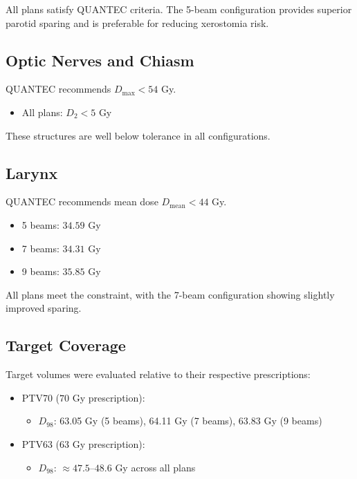 All plans satisfy QUANTEC criteria. The 5-beam configuration provides superior parotid sparing and is preferable for reducing xerostomia risk.

\subsection*{Optic Nerves and Chiasm}
QUANTEC recommends $D_{\max} < 54$ Gy.

\begin{itemize}
    \item All plans: $D_{2} < 5$ Gy
\end{itemize}

These structures are well below tolerance in all configurations.

\subsection*{Larynx}
QUANTEC recommends mean dose $D_{\text{mean}} < 44$ Gy.

\begin{itemize}
    \item 5 beams: $34.59$ Gy
    \item 7 beams: $34.31$ Gy
    \item 9 beams: $35.85$ Gy
\end{itemize}

All plans meet the constraint, with the 7-beam configuration showing slightly improved sparing.

\subsection*{Target Coverage}
Target volumes were evaluated relative to their respective prescriptions:

\begin{itemize}
    \item PTV70 ($70$ Gy prescription):
    \begin{itemize}
        \item $D_{98}$: 63.05 Gy (5 beams), 64.11 Gy (7 beams), 63.83 Gy (9 beams)
    \end{itemize}
    
    \item PTV63 ($63$ Gy prescription):
    \begin{itemize}
        \item $D_{98}$: $\approx 47.5$--$48.6$ Gy across all plans
    \end{itemize}
\end{itemize}

